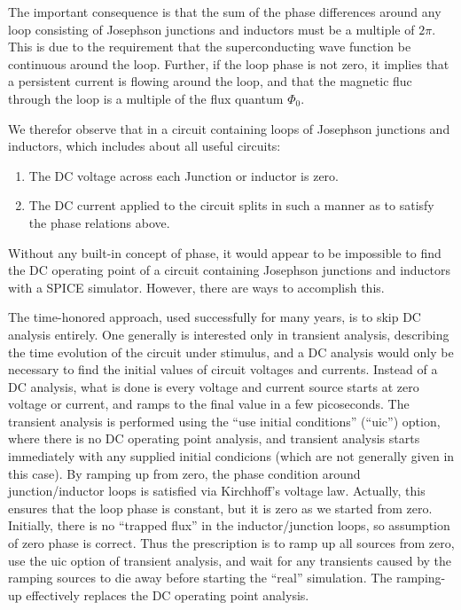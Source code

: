 The important consequence is that the sum of the phase differences
around any loop consisting of Josephson junctions and inductors must
be a multiple of $2\pi$.  This is due to the requirement that the
superconducting wave function be continuous around the loop.  Further,
if the loop phase is not zero, it implies that a persistent current is
flowing around the loop, and that the magnetic fluc through the loop
is a multiple of the flux quantum $\Phi_0$.

We therefor observe that in a circuit containing loops of Josephson
junctions and inductors, which includes about all useful circuits:

\begin{enumerate}
\item{The DC voltage across each Junction or inductor is zero.}
\item{The DC current applied to the circuit splits in such a manner
as to satisfy the phase relations above.}
\end{enumerate}

Without any built-in concept of phase, it would appear to be
impossible to find the DC operating point of a circuit containing
Josephson junctions and inductors with a SPICE simulator.  However,
there are ways to accomplish this.

The time-honored approach, used successfully for many years, is to
skip DC analysis entirely.  One generally is interested only in
transient analysis, describing the time evolution of the circuit under
stimulus, and a DC analysis would only be necessary to find the
initial values of circuit voltages and currents.  Instead of a DC
analysis, what is done is every voltage and current source starts at
zero voltage or current, and ramps to the final value in a few
picoseconds.  The transient analysis is performed using the ``use
initial conditions'' (``{\vt uic}'') option, where there is no DC
operating point analysis, and transient analysis starts immediately
with any supplied initial condicions (which are not generally given in
this case).  By ramping up from zero, the phase condition around
junction/inductor loops is satisfied via Kirchhoff's voltage law. 
Actually, this ensures that the loop phase is constant, but it is zero
as we started from zero.  Initially, there is no ``trapped flux'' in
the inductor/junction loops, so assumption of zero phase is correct. 
Thus the prescription is to ramp up all sources from zero, use the
{\vt uic} option of transient analysis, and wait for any transients
caused by the ramping sources to die away before starting the ``real''
simulation.  The ramping-up effectively replaces the DC operating
point analysis.

